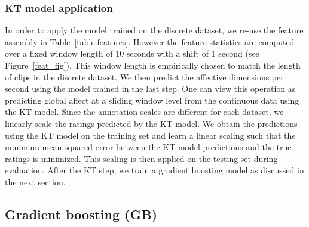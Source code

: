 \documentclass{article}
\begin{document}
\begin{spacing}{0.9}
\subsubsection{KT model application}
\vspace{-2mm}
In order to apply the model trained on the discrete dataset, we re-use the feature assembly in Table~\ref{table:features}.
However the feature statistics are computed over a fixed window length of 10 seconds with a shift of 1 second (see Figure~\ref{feat_fig}). 
This window length is empirically chosen to match the length of clips in the discrete dataset. 
We then predict the affective dimensions per second using the model trained in the last step.
One can view this operation as predicting global affect at a sliding window level from the continuous data using the KT model.
Since the annotation scales are different for each dataset, we linearly scale the ratings predicted by the KT model.
We obtain the predictions using the KT model on the training set and learn a linear scaling such that the minimum mean squared error between the KT model predictions and the true ratings is minimized.
This scaling is then applied on the testing set during evaluation. 
After the KT step, we train a gradient boosting model as discussed in the next section. 


\vspace{-2mm}
\subsection{Gradient boosting (GB)}
\vspace{-2mm}


\end{spacing}
\end{document}

